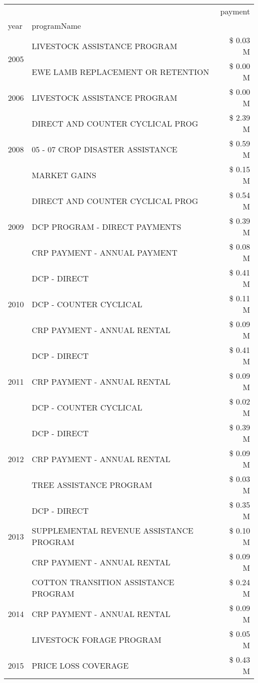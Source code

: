 \begin{tabular}{llr}
\toprule
 &  & payment \\
year & programName &  \\
\midrule
\multirow[t]{2}{*}{2005} & LIVESTOCK ASSISTANCE PROGRAM & \$ 0.03 M \\
 & EWE LAMB REPLACEMENT OR RETENTION & \$ 0.00 M \\
\cline{1-3}
2006 & LIVESTOCK ASSISTANCE PROGRAM & \$ 0.00 M \\
\cline{1-3}
\multirow[t]{3}{*}{2008} & DIRECT AND COUNTER CYCLICAL PROG & \$ 2.39 M \\
 & 05 - 07 CROP DISASTER ASSISTANCE & \$ 0.59 M \\
 & MARKET GAINS & \$ 0.15 M \\
\cline{1-3}
\multirow[t]{3}{*}{2009} & DIRECT AND COUNTER CYCLICAL PROG & \$ 0.54 M \\
 & DCP PROGRAM - DIRECT PAYMENTS & \$ 0.39 M \\
 & CRP PAYMENT - ANNUAL PAYMENT & \$ 0.08 M \\
\cline{1-3}
\multirow[t]{3}{*}{2010} & DCP - DIRECT & \$ 0.41 M \\
 & DCP - COUNTER CYCLICAL & \$ 0.11 M \\
 & CRP PAYMENT - ANNUAL RENTAL & \$ 0.09 M \\
\cline{1-3}
\multirow[t]{3}{*}{2011} & DCP - DIRECT & \$ 0.41 M \\
 & CRP PAYMENT - ANNUAL RENTAL & \$ 0.09 M \\
 & DCP - COUNTER CYCLICAL & \$ 0.02 M \\
\cline{1-3}
\multirow[t]{3}{*}{2012} & DCP - DIRECT & \$ 0.39 M \\
 & CRP PAYMENT - ANNUAL RENTAL & \$ 0.09 M \\
 & TREE ASSISTANCE PROGRAM & \$ 0.03 M \\
\cline{1-3}
\multirow[t]{3}{*}{2013} & DCP - DIRECT & \$ 0.35 M \\
 & SUPPLEMENTAL REVENUE ASSISTANCE PROGRAM & \$ 0.10 M \\
 & CRP PAYMENT - ANNUAL RENTAL & \$ 0.09 M \\
\cline{1-3}
\multirow[t]{3}{*}{2014} & COTTON TRANSITION ASSISTANCE PROGRAM & \$ 0.24 M \\
 & CRP PAYMENT - ANNUAL RENTAL & \$ 0.09 M \\
 & LIVESTOCK FORAGE PROGRAM & \$ 0.05 M \\
\cline{1-3}
\multirow[t]{3}{*}{2015} & PRICE LOSS COVERAGE & \$ 0.43 M \\

\end{tabular}
